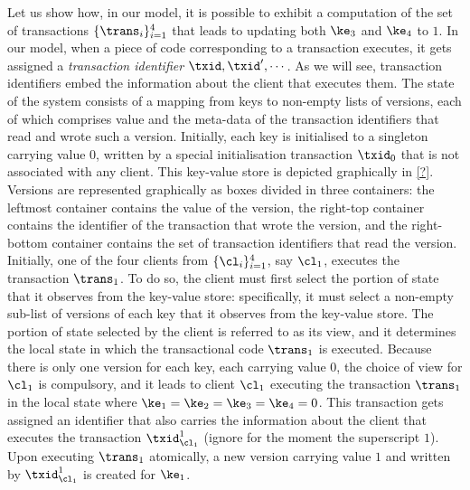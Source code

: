 Let us show how, in our model, it is possible to exhibit a computation of 
the set of transactions $\{\trans_{i}\}_{i=1}^{4}$ that leads to updating 
both $\ke_3$ and $\ke_4$ to $1$.
In our model, when a piece of code corresponding to a transaction executes, 
it gets assigned a \emph{transaction identifier} $\txid, \txid',\cdots$. 
As we will see, transaction identifiers 
embed the information about the client that executes them. 
The state of the system consists of a mapping from keys to non-empty lists of versions, each 
of which comprises value and the meta-data of the transaction identifiers 
that read and wrote such a version. Initially, each key is initialised to a singleton carrying 
value $0$, written by a special initialisation transaction $\txid_0$ that is not associated 
with any client. This key-value store is depicted graphically in \cref{?}. Versions are represented graphically
as boxes divided in three containers: the leftmost container contains the value of the version, 
the right-top container contains the identifier of the transaction that wrote the version, 
and the right-bottom container contains the set of transaction identifiers that read the version. 
Initially, one of the four clients from $\{\cl_{i}\}_{i=1}^{4}$, say 
$\cl_1$, executes the transaction $\trans_1$. To do so, the client 
must first select the portion of state that it observes from the key-value store: 
specifically, it must select a non-empty sub-list of versions of each key that it observes from 
the key-value store. The portion of state selected by the client is referred to as its view, 
and it determines the local state in which the transactional code $\trans_1$ is executed.
Because there is only one version for each key, each carrying value $0$, 
the choice of view for $\cl_1$ is compulsory, 
and it leads to client $\cl_1$ executing the transaction $\trans_1$ in the local state 
where $\ke_1 = \ke_2 = \ke_3 = \ke_4 = 0$. This transaction gets assigned an identifier 
that also carries the information about the client that executes the transaction $\txid_{\cl_{1}}^{1}$ 
(ignore for the moment the superscript $1$). Upon executing $\trans_1$ 
atomically, a new version carrying value $1$ and written by $\txid_{\cl_{1}}^{1}$ 
is created for $\ke_1$. 

